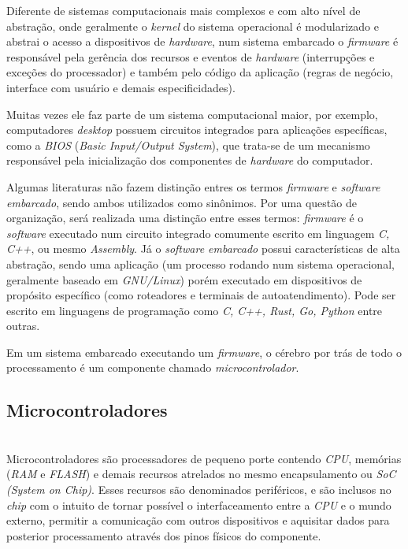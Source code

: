 \documentclass[times, twoside, watermark]{artigo}
\begin{document}
Diferente de sistemas computacionais mais complexos e com alto nível de abstração,
onde geralmente o \textit{kernel} do sistema operacional é modularizado e abstrai
o acesso a dispositivos de \textit{hardware}\cite{tanenbaum2015modern},
num sistema embarcado o \textit{firmware} é responsável pela gerência dos recursos
e eventos de \textit{hardware} (interrupções e exceções do processador) e também
pelo código da aplicação (regras de negócio, interface com usuário e demais
especificidades).

Muitas vezes ele faz parte de um sistema computacional maior,
por exemplo, computadores \textit{desktop} possuem circuitos integrados para
aplicações específicas, como a \textit{BIOS} (\textit{Basic Input/Output System}),
que trata-se de um mecanismo responsável pela inicialização dos
componentes de \textit{hardware} do computador. \cite{terzicbasic}

Algumas literaturas não fazem distinção entres os termos \textit{firmware} e
\textit{software embarcado}, sendo ambos utilizados como sinônimos. Por uma
questão de organização, será realizada uma distinção entre
esses termos: \textit{firmware} é o \textit{software} executado num circuito
integrado comumente escrito em linguagem \textit{C, C++}, ou mesmo \textit{Assembly}.
Já o \textit{software embarcado} possui características de alta abstração,
sendo uma aplicação (um processo rodando num sistema operacional,
geralmente baseado em \textit{GNU/Linux})\cite{simmonds2015mastering} porém executado
em dispositivos de propósito específico (como roteadores e terminais de
autoatendimento).
Pode ser escrito em linguagens de programação como \textit{C, C++, Rust, Go, Python}
entre outras.

Em um sistema embarcado executando um \textit{firmware}, o cérebro por trás de todo o
processamento é um componente chamado \textit{microcontrolador}.

\subsection{Microcontroladores}\hfill\\

Microcontroladores são processadores de pequeno porte contendo \textit{CPU},
memórias (\textit{RAM} e \textit{FLASH}) e demais
recursos atrelados no mesmo encapsulamento ou \textit{SoC (System on Chip)}.
Esses recursos são denominados periféricos, e são inclusos no \textit{chip}
com o intuito de tornar possível o interfaceamento entre a \textit{CPU}
e o mundo externo, permitir a comunicação com outros dispositivos e
aquisitar dados para posterior processamento através dos pinos físicos do componente.
\end{document}
